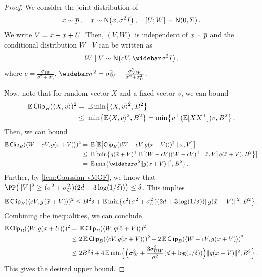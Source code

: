 \begin{proof}
We consider the joint distribution of
\begin{align*}
    \xbar\sim \pbar\,, \quad
    x\sim \normal{\xbar,\sigma^2\Id}\,, \quad
    [U;W]\sim \normal{0,\Sigma}\,.
\end{align*}
We write $V=x-\xbar+U$. Then, $(V,W)$ is independent of $\xbar\sim \pbar$ and the conditional distribution $W\mid V$ can be written as
\begin{align*}
    W\mid V\sim \normal{cV, \sigbar^2\Id },
\end{align*}
where $c=\frac{\sigma_{VW}}{\sigma^2+\sigma_U^2}$, $\sigbar^2=\sigma_W^2-\frac{\sigma_{VW}^2}{\sigma^2+\sigma_U^2}$. 

Now, note that for random vector $X$ and a fixed vector $v$, we can bound
\begin{align*}
    \En\pclip{\tri{X, v}}^2
    =&~
    \En\min\crl*{\tri{X,v}^2,B^2} \\
    \leq&~ \min\crl*{\En\tri{X,v}^2,B^2}
    =\min\crl*{v\tp(\En[XX\tp])v,B^2}\,.
\end{align*}
Then, we can bound
\begin{align*}
    \En\pclip{\tri{W-cV, g(\xbar+V)}}^2
    =&~
    \En\brk*{ \En\brk*{\pclip{\tri{W-cV, g(\xbar+V)}}^2\mid \xbar,V} }\\
    \leq&~ \En\brk*{ \min\crl*{ g(\xbar+V)\tp\En\brk*{(W-cV)(W-cV)\tp\mid \xbar,V}g(\xbar+V) ,B^2} } \\
    =&~\En\min\crl*{\sigbar^2 \nrm{g(\xbar+V)}^2,B^2}\,.
\end{align*}
Further, by \cref{lem:Gaussian-vMGF}, we know that $\PP\prn*{\nrm{V}^2\geq (\sigma^2+\sigma_U^2)(2d+3\log(1/\delta)) }\leq \delta$. This implies
\begin{align*}
    \En\pclip{\tri{cV, g(\xbar+V)}}^2
    \leq B^2\delta+\En\min\crl*{ c^2(\sigma^2+\sigma_U^2)(2d+3\log(1/\delta))\nrm{g(\xbar+V)}^2, B^2}\,.
\end{align*}
Combining the inequalities, we can conclude
\begin{align*}
    \En\pclip{\tri{W, g(x+U)}}^2
    =&~ \En\pclip{\tri{W, g(\xbar+V)}}^2\\
    \leq&~ 2\En\pclip{\tri{cV, g(\xbar+V)}}^2+2\En\pclip{\tri{W-cV, g(\xbar+V)}}^2 \\
    \leq&~ 2B^2\delta+4\En\min\crl[\Big]{\prn[\Big]{ \sigma_W^2+\frac{3\sigma_{UW}^2}{\sigma^2}(d+\log(1/\delta)) }\nrm{g(\xbar+V)}^2, B^2}\,.
\end{align*}
This gives the desired upper bound.
\end{proof}


